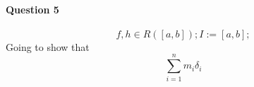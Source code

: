 \documentclass[20pt]{extarticle}
\begin{document}
\paragraph{Question 5}
\[ f,h \in R([a,b]); I:=[a,b];  \]
Going to show that
\[ \sum_{i=1}^{n} m_{i} \delta_{i} \]
\end{document}
